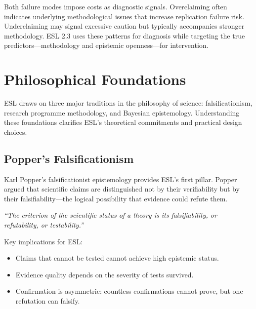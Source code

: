 \documentclass[11pt,a4paper]{article}
\begin{document}
Both failure modes impose costs as diagnostic signals. Overclaiming often indicates underlying methodological issues that increase replication failure risk. Underclaiming may signal excessive caution but typically accompanies stronger methodology. ESL 2.3 uses these patterns for diagnosis while targeting the true predictors---methodology and epistemic openness---for intervention.


\section{Philosophical Foundations}
\label{sec:philosophical-foundations}

ESL draws on three major traditions in the philosophy of science: falsificationism, research programme methodology, and Bayesian epistemology. Understanding these foundations clarifies ESL's theoretical commitments and practical design choices.

\subsection{Popper's Falsificationism}

Karl Popper's falsificationist epistemology \citep{Popper1959} provides ESL's first pillar. Popper argued that scientific claims are distinguished not by their verifiability but by their falsifiability---the logical possibility that evidence could refute them.

\begin{historicalbox}[title={Popper's Demarcation Criterion (1934/1959)}]
\textit{``The criterion of the scientific status of a theory is its falsifiability, or refutability, or testability.''}

Key implications for ESL:
\begin{itemize}
    \item Claims that cannot be tested cannot achieve high epistemic status.
    \item Evidence quality depends on the severity of tests survived.
    \item Confirmation is asymmetric: countless confirmations cannot prove, but one refutation can falsify.
\end{itemize}
\end{historicalbox}
\end{document}
